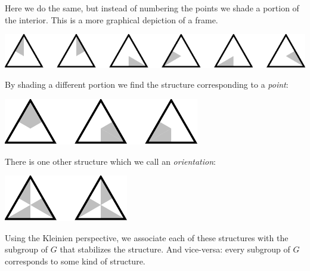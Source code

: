\documentclass[11pt,oneside]{article}
\begin{document}
Here we do the same, but instead of numbering the points
we shade a portion of the interior.
This is a more graphical depiction of a frame.
\begin{center}
\includegraphics[]{pic-triangle-frames.pdf} 
\end{center}
By shading a different portion we find the structure
corresponding to a \emph{point}:
\begin{center}
\includegraphics[]{pic-triangle-points.pdf} 
\end{center}
There is one other structure which we call an \emph{orientation}:
\begin{center}
\includegraphics[]{pic-triangle-orientations.pdf} 
\end{center}

Using the Kleinien perspective, we associate
each of these structures with the subgroup of $G$
that stabilizes the structure.
And vice-versa: every subgroup of $G$ corresponds
to some kind of structure.

\end{document}

